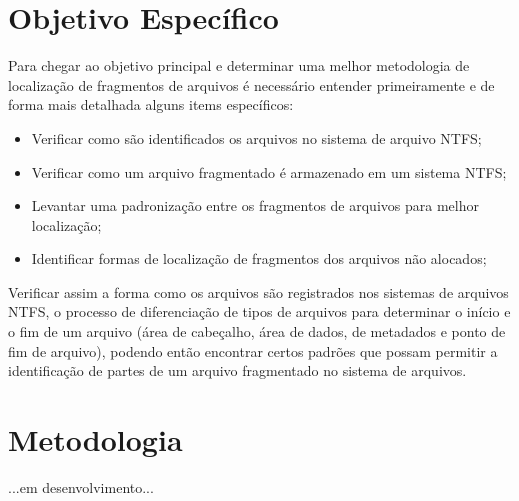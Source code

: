 \section{Objetivo Específico}
Para chegar ao objetivo principal e determinar uma melhor metodologia de localização de fragmentos de arquivos é necessário entender primeiramente e de forma mais detalhada alguns items específicos:

\begin{itemize}
 \item Verificar como são identificados os arquivos no sistema de arquivo NTFS;
 \item Verificar como um arquivo fragmentado é armazenado em um sistema NTFS;
 \item Levantar uma padronização entre os fragmentos de arquivos para melhor localização;
 \item Identificar formas de localização de fragmentos dos arquivos não alocados;
\end{itemize}

Verificar assim a forma como os arquivos são registrados nos sistemas de arquivos NTFS, o processo de diferenciação de tipos de arquivos para determinar o início e o fim de um arquivo (área de cabeçalho, área de dados, de metadados e ponto de fim de arquivo), podendo então encontrar certos padrões que possam permitir a identificação de partes de um arquivo fragmentado no sistema de arquivos.

\section{Metodologia}
...em desenvolvimento...